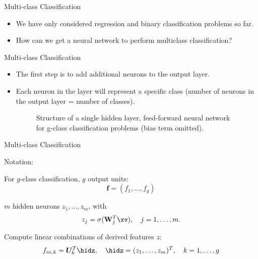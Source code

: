 \begin{frame} {Multi-class Classification}
\vspace{20mm}
\begin{itemize}
\item We have only considered regression and binary classification problems so far.
\vspace{5mm}
\item How can we get a neural network to perform multiclass classification?
  \end{itemize}
\end{frame}

\begin{frame} {Multi-class Classification}
\begin{itemize}
\item The first step is to add additional neurons to the output layer.
\item Each neuron in the layer will represent a specific class (number of neurons in the output layer = number of classes).
\begin{figure}
\centering
{}
\caption{\footnotesize Structure of a single hidden layer, feed-forward neural network for g-class classification problems (bias term omitted).}
\end{figure}
\end{itemize}
\end{frame}

\begin{frame} {Multi-class Classification}
\vspace{5mm}
\begin{blocki}{Notation:}
\item For $g$-class classification, $g$ output units: $$\mathbf{f} = (f_1, \dots, f_g)$$
\vspace{4mm}
\item $m$ hidden neurons $z_1, \dots, z_m$, with
    $$ z_j = \sigma(\mathbf{W}_j^T \xv), \quad j = 1,\ldots,m. $$
\item Compute linear combinations of derived features $z$:
    $$ f_{in,k} = \bm{U}_k^T \hidz, \quad \hidz=(z_1,\dots, z_m)^T, \quad k = 1,\ldots,g$$
\end{blocki}
\end{frame}

